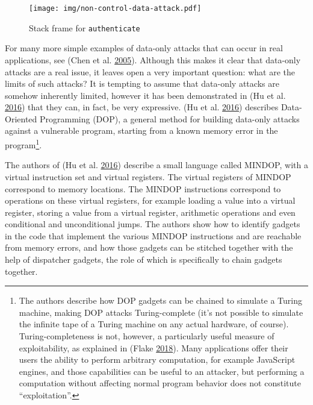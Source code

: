 \documentclass[a4paper,]{report}
\begin{document}
\begin{figure}
\hypertarget{fig:non-control-data-attack}{%
\centering
\texttt{[image: img/non-control-data-attack.pdf]}
\caption{Stack frame for
\texttt{authenticate}}\label{fig:non-control-data-attack}
}
\end{figure}

For many more simple examples of data-only attacks that can occur in
real applications, see (Chen et al.
\protect\hyperlink{ref-Chen2005}{2005}). Although this makes it clear
that data-only attacks are a real issue, it leaves open a very important
question: what are the limits of such attacks? It is tempting to assume
that data-only attacks are somehow inherently limited, however it has
been demonstrated in (Hu et al. \protect\hyperlink{ref-Hu2016}{2016})
that they can, in fact, be very expressive. (Hu et al.
\protect\hyperlink{ref-Hu2016}{2016}) describes Data-Oriented
Programming (DOP), a general method for building data-only attacks
against a vulnerable program, starting from a known memory error in the
program\footnote{The authors describe how DOP gadgets can be chained to
  simulate a Turing machine, making DOP attacks Turing-complete (it's
  not possible to simulate the infinite tape of a Turing machine on any
  actual hardware, of course). Turing-completeness is not, however, a
  particularly useful measure of exploitability, as explained in (Flake
  \protect\hyperlink{ref-Dullien2018}{2018}). Many applications offer
  their users the ability to perform arbitrary computation, for example
  JavaScript engines, and those capabilities can be useful to an
  attacker, but performing a computation without affecting normal
  program behavior does not constitute ``exploitation''.}.

The authors of (Hu et al. \protect\hyperlink{ref-Hu2016}{2016}) describe
a small language called MINDOP, with a virtual instruction set and
virtual registers. The virtual registers of MINDOP correspond to memory
locations. The MINDOP instructions correspond to operations on these
virtual registers, for example loading a value into a virtual register,
storing a value from a virtual register, arithmetic operations and even
conditional and unconditional jumps. The authors show how to identify
gadgets in the code that implement the various MINDOP instructions and
are reachable from memory errors, and how those gadgets can be stitched
together with the help of dispatcher gadgets, the role of which is
specifically to chain gadgets together.
\end{document}

